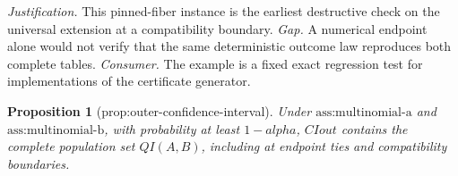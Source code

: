 \documentclass{article}
\newtheorem{proposition}{Proposition}
\begin{document}
\par\smallskip\noindent \textit{Justification.} This pinned-fiber instance is the earliest destructive check on the universal extension at a compatibility boundary. \textit{Gap.} A numerical endpoint alone would not verify that the same deterministic outcome law reproduces both complete tables. \textit{Consumer.} The example is a fixed exact regression test for implementations of the certificate generator.

\begin{proposition}[prop:outer-confidence-interval]\label{prop:outer-confidence-interval}
Under \(\text{ass:multinomial-a}\) and \(\text{ass:multinomial-b}\), with probability at least \(1-alpha\), \(CIout\) contains the complete population set \(QI(A,B)\), including at endpoint ties and compatibility boundaries.
\end{proposition}
\end{document}
